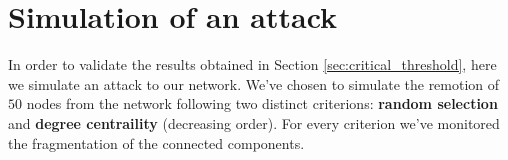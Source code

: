     \section{Simulation of an attack} %
    \label{sec:simulation_of_an_attack}
        In order to validate the results obtained in Section \ref{sec:critical_threshold}, here we simulate an
        attack to our network. We've chosen to simulate the remotion of $50$ nodes from the network following two
        distinct criterions: \textbf{random selection} and \textbf{degree centraility} (decreasing order). For every
        criterion we've monitored the fragmentation of the connected components.

        \begin{figure}[H]
            \centering
            \begin{subfigure}{0.45\textwidth}
                \caption{}
                \label{test_cc_on_random}
            \end{subfigure}
            \begin{subfigure}{0.45\textwidth}
\end{subfigure}
\end{figure}
